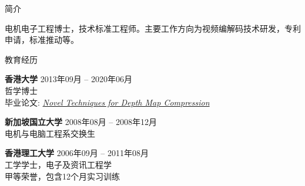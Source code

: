 \documentclass{resume} %
\begin{document}

\begin{rSection}{简介}

电机电子工程博士，技术标准工程师。主要工作方向为视频编解码技术研发，专利申请，标准推动等。

\end{rSection}


\begin{rSection}{教育经历}

{\bf 香港大学} \hfill {2013年09月 -- 2020年06月} \\ 
哲学博士 \\
毕业论文: \href{http://hdl.handle.net/10722/318421}{\textit{Novel Techniques for Depth Map Compression}}

{\bf 新加坡国立大学} \hfill {2008年08月 -- 2008年12月} \\ 
电机与电脑工程系交换生

{\bf 香港理工大学} \hfill {2006年09月 -- 2011年08月} \\ 
工学学士，电子及资讯工程学 \\
甲等荣誉，包含12个月实习训练

\end{rSection}

\end{document}
